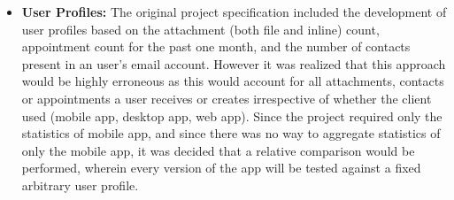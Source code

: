 \begin{itemize}
	\item\textbf{User Profiles:} The original project specification included the development of user profiles based on the attachment (both file and inline) count, appointment count for the past one month, and the number of contacts present in an user's email account. However it was realized that this approach would be highly erroneous as this would account for all attachments, contacts or appointments a user receives or creates irrespective of whether the client used (mobile app, desktop app, web app). Since the project required only the statistics of mobile app, and since there was no way to aggregate statistics of only the mobile app, it was decided that a relative comparison would be performed, wherein every version of the app will be tested against a fixed arbitrary user profile.\\
\end{itemize}